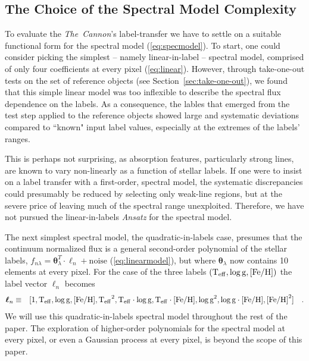\documentclass[12pt, preprint]{aastex}
\newcommand{\sectionname}{Section}
\newcommand{\tc}{\textsl{The~Cannon}}
\newcommand{\set}[1]{\bm{#1}}
\newcommand{\starlabel}{\ell}
\newcommand{\starlabelvec}{\set{\starlabel}}
\newcommand{\teff}{\mbox{$\rm T_{eff}$}}
\newcommand{\feh}{\mbox{$\rm [Fe/H]$}}
\newcommand{\logg}{\mbox{$\rm \log g$}}
\begin{document}
\subsection{The Choice of the Spectral Model Complexity}
\label{sec:ModelComplexity} 

To evaluate the \tc 's label-transfer we have to settle on a suitable functional form for the spectral model (\ref{eq:specmodel}).
To start, one could consider picking the simplest -- namely linear-in-label -- spectral model, comprised of only four coefficients at every pixel (\ref{eq:linear}).
However, through take-one-out tests on the set of reference objects (see \sectionname~\ref{sec:take-one-out}), we found that this simple linear model was too inflexible to describe the spectral flux dependence on the labels.
As a consequence, the lables that emerged from the test step applied to the reference objects showed large and systematic deviations compared to ``known" input label values,
especially at the extremes of the labels' ranges. 

This is perhaps not surprising, as absorption features, particularly strong lines, are known to vary non-linearly as a function of stellar labels. If one were to insist on a label transfer with a first-order, spectral model, the systematic discrepancies could presumably be reduced by selecting only weak-line regions, but at the severe price of leaving much of the spectral range unexploited. Therefore, we have not pursued the linear-in-labels \textit{Ansatz} for the spectral model.


The next simplest spectral model, the quadratic-in-labels case,
 presumes that the continuum normalized flux is a general second-order polynomial of the stellar labels, $f_{n\lambda} =
\set{\theta}_\lambda^T \cdot \starlabelvec_n + \mbox{noise}$ 
(\ref{eq:linearmodel}), 
but where $\set{\theta}_\lambda$ now contains 10 elements at every pixel.
For the case of the three labels $(\teff , \logg , \feh)$ the label vector $\starlabelvec_n$
becomes  
\begin{eqnarray}
\starlabelvec_n &\equiv&
[1, \teff, \logg, \feh, \teff^2, \teff\cdot\logg, \teff\cdot\feh, \logg^2, \logg\cdot\feh, \feh^2]
 \label{eq:quadinthreelabels}\quad.
\end{eqnarray}
We will use this quadratic-in-labels spectral model throughout the rest of the paper. 
The exploration of higher-order polynomials for the spectral model at every pixel, or even a Gaussian process at every pixel, is beyond the scope of this paper. 
 
\end{document}
